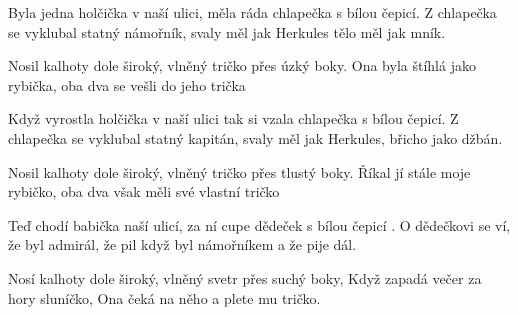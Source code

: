 
\beginverse{}
Byla jedna holčička v naší ulici,
měla ráda chlapečka s bílou čepicí.
Z chlapečka se vyklubal statný námořník,
svaly měl jak Herkules tělo měl jak mník.
\endverse{}

\beginchorus{}
Nosil kalhoty dole široký,
vlněný tričko přes úzký boky.
Ona byla štíhlá jako rybička,
oba dva se vešli do jeho trička
\endchorus{}

\beginverse{}
Když vyrostla holčička v naší ulici
tak si vzala chlapečka s bílou čepicí.
Z chlapečka se vyklubal statný kapitán,
svaly měl jak Herkules, břicho jako džbán.
\endverse{}

\beginchorus{}
Nosil kalhoty dole široký,
vlněný tričko přes tlustý boky.
Říkal jí stále moje rybičko,
oba dva však měli své vlastní tričko
\endchorus{}

\beginverse{}
Teď chodí babička naší ulicí,
za ní cupe dědeček s bílou čepicí .
O dědečkovi se ví, že byl admirál,
že pil když byl námořníkem a že pije dál.
\endverse{}

\beginchorus{}
Nosí kalhoty dole široký,
vlněný svetr přes suchý boky,
Když zapadá večer za hory sluníčko,
Ona čeká na něho a plete mu tričko.
\endchorus{}

\endsong{}
